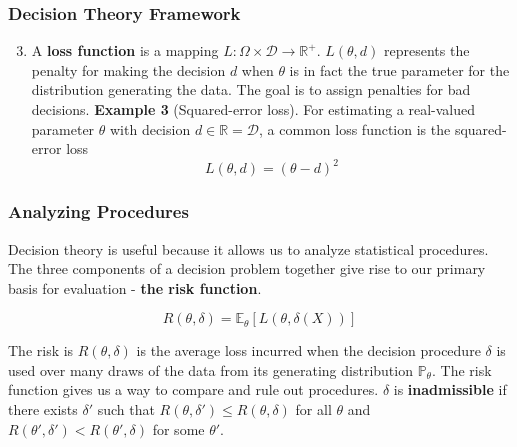 \documentclass[10pt]{beamer}
\begin{document}
\begin{frame}
\frametitle{Decision Theory Framework}
\begin{enumerate}
\setcounter{enumi}{2}
\item{A \textbf{loss function} is a mapping $L: \Omega \times \mathcal{D} \rightarrow \mathbb{R}^{+}$. 
\newline
\newline 
$L(\theta, d)$ represents the penalty for making the decision $d$ when $\theta$ is in fact the true parameter for the distribution generating the data. 
\newline
\newline 
The goal is to assign penalties for bad decisions.
\newline
\newline 
\textbf{Example 3} (Squared-error loss). 
\newline
\newline 
For estimating a real-valued parameter $\theta$ with decision $d \in \mathbb{R} = \mathcal{D}$, a common loss function is the squared-error loss
$$ L(\theta, d) = (\theta - d)^2$$ 
}	
\end{enumerate}
	
\end{frame}



\begin{frame}
\frametitle{Analyzing Procedures}
Decision theory is useful because it allows us to analyze statistical procedures.
\newline
\newline
The three components of a decision problem together give rise to our primary basis for evaluation - \textbf{the risk function}.

$$ R(\theta, \delta) = \mathbb{E}_{\theta}[L(\theta, \delta(X))] $$

The risk is $R(\theta, \delta)$ is the average loss incurred when the decision procedure $\delta$ is used over many draws of the data from its generating distribution $\mathbb{P}_{\theta}$.
\newline
\newline
The risk function gives us a way to compare and rule out procedures. 
\newline
\newline
$\delta$ is \textbf{inadmissible} if there exists $\delta'$ such that $R(\theta, \delta') \leq R(\theta, \delta)$ for all $\theta$ and  
$R(\theta', \delta') < R(\theta', \delta)$ for some $\theta'$.
\end{frame}
\end{document}
